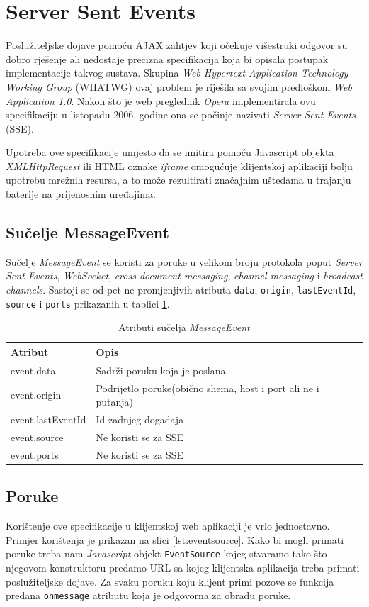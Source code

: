 \documentclass[times, utf8, zavrsni]{fer}
\begin{document}
\section{Server Sent Events}

Poslužiteljske dojave pomoću AJAX zahtjev koji očekuje višestruki odgovor su dobro rješenje ali nedostaje precizna specifikacija koja bi opisala postupak implementacije takvog sustava. Skupina {\em Web Hypertext Application Technology Working Group} (WHATWG) ovaj problem je riješila sa svojim predloškom {\em Web Application 1.0}. Nakon što je web preglednik {\em Opera} implementirala ovu specifikaciju u listopadu 2006. godine ona se počinje nazivati {\em Server Sent Events} (SSE).

Upotreba ove specifikacije umjesto da se imitira pomoću Javascript objekta {\em XMLHttpRequest} ili HTML oznake {\em iframe} omogućuje klijentskoj aplikaciji bolju upotrebu mrežnih resursa, a to može rezultirati značajnim uštedama u trajanju baterije na prijenosnim uređajima.

\subsection{Sučelje MessageEvent}
Sučelje {\em MessageEvent} se koristi za poruke u velikom broju protokola poput {\em Server Sent Events}, {\em WebSocket}, {\em cross-document messaging}, {\em channel messaging} i {\em broadcast channels}. Sastoji se od pet ne promjenjivih atributa {\tt data}, {\tt origin}, {\tt lastEventId}, {\tt source} i {\tt ports} prikazanih u tablici \ref{tbl:messageevent}.

\begin{table}[htb]
\caption{Atributi sučelja {\em MessageEvent}}
\label{tbl:messageevent}
\centering
\begin{tabular}{lll} \hline
Atribut & Opis \\ \hline
event.data & Sadrži poruku koja je poslana\\
event.origin & Podrijetlo poruke(obično shema, host i port ali ne i putanja)\\
event.lastEventId & Id zadnjeg događaja\\
event.source & Ne koristi se za SSE\\
event.ports & Ne koristi se za SSE\\
\end{tabular}
\end{table}

\subsection{Poruke}
Korištenje ove specifikacije u klijentskoj web aplikaciji je vrlo jednostavno. Primjer korištenja je prikazan na slici \ref{lst:eventsource}. Kako bi mogli primati poruke treba nam {\em Javascript} objekt {\tt EventSource} kojeg stvaramo tako što njegovom konstruktoru predamo URL sa kojeg klijentska aplikacija treba primati poslužiteljske dojave. Za svaku poruku koju klijent primi pozove se funkcija predana {\tt onmessage} atributu koja je odgovorna za obradu poruke.
\end{document}
